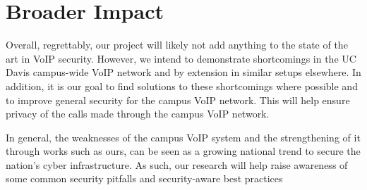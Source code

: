 \section{Broader Impact}


Overall, regrettably, our project will likely not add anything to the state of the art in VoIP security. However, we intend to demonstrate shortcomings in the UC Davis campus-wide VoIP network and by extension in similar setups elsewhere. In addition, it is our goal to find solutions to these shortcomings where possible and to improve general security for the campus VoIP network. This will help ensure privacy of the calls made through the campus VoIP network.

In general, the weaknesses of the campus VoIP system and the strengthening of it through works such as ours, can be seen as a growing national trend to secure the nation's cyber infrastructure. As such, our research will help raise awareness of some common security pitfalls and security-aware best practices  